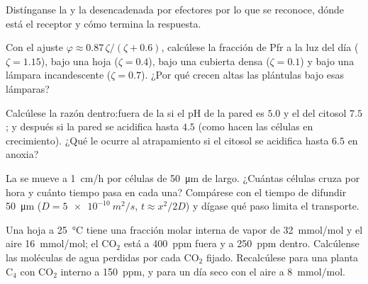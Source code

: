\begin{exercise}[$\star$]\label{exo:b3:plant-molecular-physiology:4}
Distínganse la  y la desencadenada
por efectores por lo que se reconoce, dónde está el receptor y cómo
termina la respuesta.
\end{exercise}

\begin{exercise}[$\star\star$]\label{exo:b3:plant-molecular-physiology:5}
Con el ajuste $\varphi \approx 0.87\,\zeta/(\zeta + 0.6)$, calcúlese la
fracción de Pfr a la luz del día ($\zeta = 1.15$), bajo una hoja
($\zeta =
0.4$), bajo una cubierta densa ($\zeta = 0.1$) y bajo una lámpara
incandescente ($\zeta = 0.7$). ¿Por qué crecen altas las plántulas bajo
esas lámparas?
\end{exercise}

\begin{exercise}[$\star\star$]\label{exo:b3:plant-molecular-physiology:6}
Calcúlese la razón dentro:fuera de la  si el pH de la pared es
$5.0$ y el del citosol $7.5$; y después si la pared se acidifica hasta
$4.5$ (como hacen las células en crecimiento). ¿Qué le ocurre al
atrapamiento si el citosol se acidifica hasta $6.5$ en anoxia?
\end{exercise}

\begin{exercise}[$\star\star$]\label{exo:b3:plant-molecular-physiology:7}
La  se mueve a \qty{1}{cm/h} por células de \qty{50}{\micro m} de
largo. ¿Cuántas células cruza por hora y cuánto tiempo pasa en cada
una? Compárese con el tiempo de difundir \qty{50}{\micro m} ($D =
\qty{5e-10}{m^2/s}$, $t \approx x^{2}/2D$) y dígase qué paso limita el
transporte.
\end{exercise}

\begin{exercise}[$\star\star$]\label{exo:b3:plant-molecular-physiology:8}
Una hoja a \qty{25}{\celsius} tiene una fracción molar interna de vapor
de \qty{32}{mmol/mol} y el aire \qty{16}{mmol/mol}; el CO$_{2}$ está a
\qty{400}{ppm} fuera y a \qty{250}{ppm} dentro. Calcúlense las
moléculas de agua perdidas por cada CO$_{2}$ fijado. Recalcúlese para
una planta C$_{4}$ con CO$_{2}$ interno a \qty{150}{ppm}, y para un día
seco con el aire a \qty{8}{mmol/mol}.
\end{exercise}

